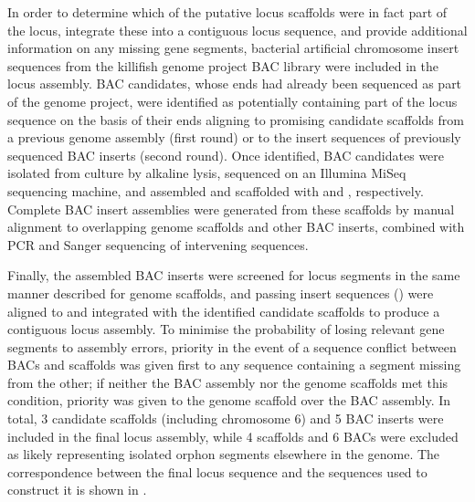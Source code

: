 In order to determine which of the putative locus scaffolds were in fact part of the \igh{} locus, integrate these into a contiguous locus sequence, and provide additional information on any missing gene segments, bacterial artificial chromosome insert sequences from the killifish genome project BAC library \parencite{reichwald2015genome} were included in the locus assembly. BAC candidates, whose ends had already been sequenced as part of the genome project, were identified as potentially containing part of the locus sequence on the basis of their ends aligning to promising candidate scaffolds from a previous genome assembly (first round) or to the insert sequences of previously sequenced BAC inserts (second round). Once identified,  BAC candidates were isolated from culture by alkaline lysis, sequenced on an Illumina MiSeq sequencing machine, and assembled and scaffolded with  and , respectively. Complete BAC insert assemblies were generated from these scaffolds by manual alignment to overlapping genome scaffolds and other BAC inserts, combined with PCR and Sanger sequencing of intervening sequences.

Finally, the assembled BAC inserts were screened for \igh{} locus segments in the same manner described for genome scaffolds, and passing insert sequences () were aligned to and integrated with the identified candidate scaffolds to produce a contiguous locus assembly. To minimise the probability of losing relevant gene segments to assembly errors, priority in the event of a sequence conflict between BACs and scaffolds was given first to any sequence containing a segment missing from the other; if neither the BAC assembly nor the genome scaffolds met this condition, priority was given to the genome scaffold over the BAC assembly. In total, 3 candidate scaffolds (including chromosome 6) and 5 BAC inserts were included in the final locus assembly, while 4 scaffolds and 6 BACs were excluded as likely representing isolated \igh{} orphon segments elsewhere in the genome. The correspondence between the final locus sequence and the sequences used to construct it is shown in .

